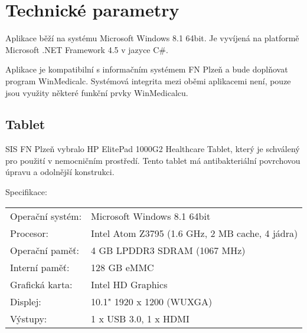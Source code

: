 \chapter{Technické parametry}

Aplikace běží na systému Microsoft Windows 8.1 64bit. Je vyvíjená na platformě Microsoft .NET Framework 4.5 v jazyce C\#.

Aplikace je kompatibilní s informačním systémem FN Plzeň a bude doplňovat program WinMedicalc. Systémová integrita mezi oběmi aplikacemi není, pouze jsou využity některé funkční prvky WinMedicalcu.

\section{Tablet}

SIS FN Plzeň vybralo HP ElitePad 1000G2 Healthcare Tablet, který je schválený pro použití v nemocničním prostředí. Tento tablet má antibakteriální povrchovou úpravu a odolnější konstrukci.

\noindent
Specifikace:

\noindent
\begin{tabular}{l l}
	Operační systém: & Microsoft Windows 8.1 64bit\\
	Procesor: & Intel Atom Z3795 (1.6 GHz, 2 MB cache, 4 jádra)\\
	Operační paměť: & 4 GB LPDDR3 SDRAM (1067 MHz)\\
	Interní paměť: & 128 GB eMMC\\
	Grafická karta: & Intel HD Graphics\\
	Displej: & 10.1" 1920 x 1200 (WUXGA)\\
	Výstupy: & 1 x USB 3.0, 1 x HDMI
\end{tabular}
